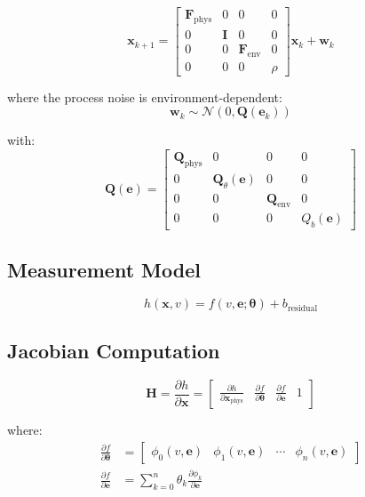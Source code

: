 \documentclass[11pt]{article}
\begin{document}
\begin{equation}
\mathbf{x}_{k+1} = \begin{bmatrix}
\mathbf{F}_{\text{phys}} & 0 & 0 & 0 \\
0 & \mathbf{I} & 0 & 0 \\
0 & 0 & \mathbf{F}_{\text{env}} & 0 \\
0 & 0 & 0 & \rho
\end{bmatrix} \mathbf{x}_k + \mathbf{w}_k
\end{equation}

where the process noise is environment-dependent:
\begin{equation}
\mathbf{w}_k \sim \mathcal{N}(0, \mathbf{Q}(\mathbf{e}_k))
\end{equation}

with:
\begin{equation}
\mathbf{Q}(\mathbf{e}) = \begin{bmatrix}
\mathbf{Q}_{\text{phys}} & 0 & 0 & 0 \\
0 & \mathbf{Q}_{\theta}(\mathbf{e}) & 0 & 0 \\
0 & 0 & \mathbf{Q}_{\text{env}} & 0 \\
0 & 0 & 0 & Q_b(\mathbf{e})
\end{bmatrix}
\end{equation}

\subsection{Measurement Model}

\begin{equation}
h(\mathbf{x}, v) = f(v, \mathbf{e}; \bm{\theta}) + b_{\text{residual}}
\end{equation}

\subsection{Jacobian Computation}

\begin{equation}
\mathbf{H} = \frac{\partial h}{\partial \mathbf{x}} = \begin{bmatrix}
\frac{\partial h}{\partial \mathbf{x}_{\text{phys}}} & \frac{\partial f}{\partial \bm{\theta}} & \frac{\partial f}{\partial \mathbf{e}} & 1
\end{bmatrix}
\end{equation}

where:
\begin{align}
\frac{\partial f}{\partial \bm{\theta}} &= \begin{bmatrix} \phi_0(v, \mathbf{e}) & \phi_1(v, \mathbf{e}) & \cdots & \phi_n(v, \mathbf{e}) \end{bmatrix} \\
\frac{\partial f}{\partial \mathbf{e}} &= \sum_{k=0}^{n} \theta_k \frac{\partial \phi_k}{\partial \mathbf{e}}
\end{align}
\end{document}
